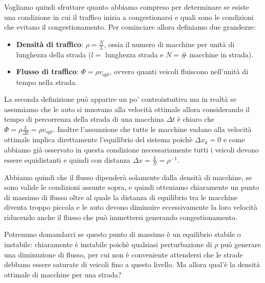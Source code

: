 Vogliamo quindi sfruttare quanto abbiamo compreso per determinare se esiste una condizione in cui il traffico inizia a congestionarsi e quali sono le condizioni che evitano il congestionamento. Per cominciare allora definiamo due grandezze:
\begin{itemize}
	\item \textbf{Densità di traffico}: $\rho = \frac{N}{L}$, ossia il numero di macchine per unità di lunghezza della strada ($l=$ lunghezza strada e $N=\#$ macchine in strada).
	\item \textbf{Flusso di traffico}: $\Phi=\rho v_{opt}$, ovvero quanti veicoli fluiscono nell'unità di tempo nella strada.
\end{itemize}
La seconda definizione può apparire un po' controintuitiva ma in realtà se assumiamo che le auto si muovano alla velocità ottimale allora considerando il tempo di percorrenza della strada di una macchina $\Delta t$ è chiaro che $\Phi=\rho \frac{L}{\Delta t}=\rho v_{opt}$. Inoltre l'assunzione che tutte le macchine vadano alla velocità ottimale implica direttamente l'equilibrio del sistema poichè $\dot{\Delta x_k}=0$ e come abbiamo già osservato in questa condizione necessariamente tutti i veicoli devono essere equidistanti e quindi con distanza $\Delta x=\frac{L}{N}=\rho^{-1}$.
\begin{multicols}{2}

Abbiamo quindi che il flusso dipenderà solamente dalla densità di macchine, se sono valide le condizioni assunte sopra, e quindi otteniamo chiaramente un punto di massimo di flusso oltre al quale la distanza di equilibrio tra le macchine diventa troppo piccola e le auto devono diminuire eccessivamente la loro velocità riducendo anche il flusso che può immettersi generando congestionamento.


\end{multicols}
Potremmo domandarci se questo punto di massimo è un equilibrio stabile o instabile: chiaramente è instabile poichè qualsiasi perturbazione di $\rho$ può generare una diminuzione di flusso, per cui non è conveniente attendersi che le strade debbano essere saturate di veicoli fino a questo livello. Ma allora qual'è la densità ottimale di macchine per una strada?\\

